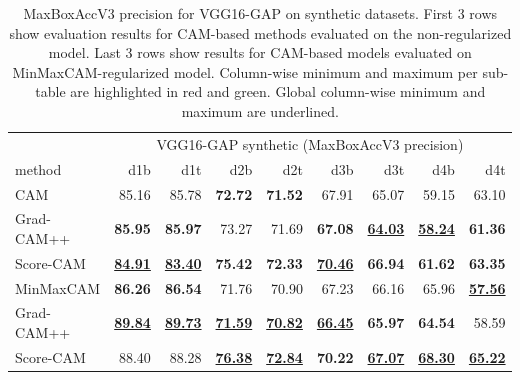 \begin{table}[h]
\centering
\begin{tabular}{lrrrrrrrr}
\toprule
 & \multicolumn{8}{c}{VGG16-GAP synthetic (MaxBoxAccV3 precision)} \\
method & d1b & d1t & d2b & d2t & d3b & d3t & d4b & d4t \\
\cmidrule(lr){1-1} \cmidrule(lr){2-9} 
CAM & 85.16 & 85.78 & \color{purple} \bfseries 72.72 & \color{purple} \bfseries 71.52 & 67.91 & 65.07 & 59.15 & 63.10 \\
Grad-CAM++ & \color{teal} \bfseries 85.95 & \color{teal} \bfseries 85.97 & 73.27 & 71.69 & \color{purple} \bfseries 67.08 & \color{purple} \bfseries \underline{64.03} & \color{purple} \bfseries \underline{58.24} & \color{purple} \bfseries 61.36 \\
Score-CAM & \color{purple} \bfseries \underline{84.91} & \color{purple} \bfseries \underline{83.40} & \color{teal} \bfseries 75.42 & \color{teal} \bfseries 72.33 & \color{teal} \bfseries \underline{70.46} & \color{teal} \bfseries 66.94 & \color{teal} \bfseries 61.62 & \color{teal} \bfseries 63.35 \\
\cmidrule(lr){1-1} \cmidrule(lr){2-9} 
MinMaxCAM & \color{purple} \bfseries 86.26 & \color{purple} \bfseries 86.54 & 71.76 & 70.90 & 67.23 & 66.16 & 65.96 & \color{purple} \bfseries \underline{57.56} \\
Grad-CAM++ & \color{teal} \bfseries \underline{89.84} & \color{teal} \bfseries \underline{89.73} & \color{purple} \bfseries \underline{71.59} & \color{purple} \bfseries \underline{70.82} & \color{purple} \bfseries \underline{66.45} & \color{purple} \bfseries 65.97 & \color{purple} \bfseries 64.54 & 58.59 \\
Score-CAM & 88.40 & 88.28 & \color{teal} \bfseries \underline{76.38} & \color{teal} \bfseries \underline{72.84} & \color{teal} \bfseries 70.22 & \color{teal} \bfseries \underline{67.07} & \color{teal} \bfseries \underline{68.30} & \color{teal} \bfseries \underline{65.22} \\
\bottomrule
\end{tabular}
\caption[MaxBoxAccV3 for VGG16-GAP on synthetic datasets]{MaxBoxAccV3 precision for VGG16-GAP on synthetic datasets. First 3 rows show evaluation results for CAM-based methods evaluated on the non-regularized model. Last 3 rows show results for CAM-based models evaluated on MinMaxCAM-regularized model. Column-wise minimum and maximum per sub-table are highlighted in red and green. Global column-wise minimum and maximum are underlined.}
\label{tab:maxboxaccv3_precision_vgg16_gap_synthetic}
\end{table}

